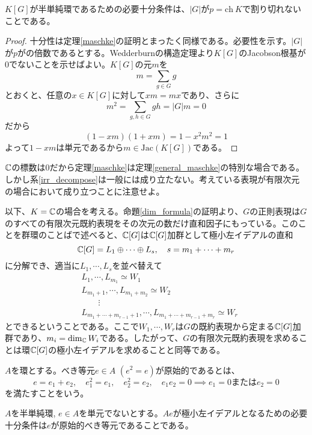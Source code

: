 \documentclass{ltjsreport}
\begin{document}
\begin{theo}[Maschkeの定理]\label{general_maschke}
  $K[G]$が半単純環であるための必要十分条件は、$|G|$が$p=\text{ch}\:K$で割り切れないことである。
\end{theo}

\begin{proof}
  十分性は定理\ref{maschke}の証明とまったく同様である。必要性を示す。$|G|$が$p$がの倍数であるとする。Wedderburnの構造定理より$K[G]$のJacobson根基が0でないことを示せばよい。$K[G]$の元$m$を
  \[
  m=\sum_{g\in G}g  
  \]
  とおくと、任意の$x\in K[G]$に対して$xm=mx$であり、さらに
  \[
  m^2=\sum_{g,h\in G}gh=|G|m=0  
  \]
  だから
  \[
  (1-xm)(1+xm)=1-x^2m^2=1  
  \]
  よって$1-xm$は単元であるから$m\in\text{Jac}(K[G])$である。
\end{proof}


$\mathbb{C}$の標数は0だから定理\ref{maschke}は定理\ref{general_maschke}の特別な場合である。しかし系\ref{irr_decompose}は一般には成り立たない。考えている表現が有限次元の場合において成り立つことに注意せよ。

以下、$K=\mathbb{C}$の場合を考える。命題\ref{dim_formula}の証明より、$G$の正則表現は$G$のすべての有限次元既約表現をその次元の数だけ直和因子にもっている。このことを群環のことばで述べると、$\mathbb{C}[G]$は$\mathbb{C}[G]$加群として極小左イデアルの直和
\[
\mathbb{C}[G]=L_1\oplus\cdots\oplus L_s,\quad s=m_1+\cdots+m_r
\]
に分解でき、適当に$L_1,\cdots,L_s$を並べ替えて
\begin{align*}
&L_1,\cdots,L_{m_1}\simeq W_1\\
&L_{m_1+1},\cdots,L_{m_1+m_2}\simeq W_2\\
&\qquad \vdots\\
&L_{m_1+\cdots+m_{r-1}+1},\cdots,L_{m_1+\cdots+m_{r-1}+m_r}\simeq W_r
\end{align*}
とできるということである。ここで$W_1,\cdots,W_r$は$G$の既約表現から定まる$\mathbb{C}[G]$加群であり、$m_i=\dim_{\mathbb{C}}W_i$である。したがって、$G$の有限次元既約表現を求めることは環$\mathbb{C}[G]$の極小左イデアルを求めることと同等である。

\begin{defin}
  $A$を環とする。べき等元$e\in A$ $(e^2=e)$が原始的であるとは、
  \[
  e=e_1+e_2,\quad e_1^2=e_1,\quad e_2^2=e_2,\quad e_1e_2=0\implies e_1=0\text{または}e_2=0 
  \]
  を満たすことをいう。
\end{defin}

\begin{prop}
  $A$を半単純環, $e\in A$を単元でないとする。$Ae$が極小左イデアルとなるための必要十分条件は$e$が原始的べき等元であることである。
\end{prop}
\end{document}
